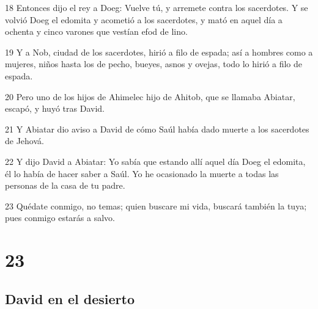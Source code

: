 \par 18 Entonces dijo el rey a Doeg: Vuelve tú, y arremete contra los sacerdotes. Y se volvió Doeg el edomita y acometió a los sacerdotes, y mató en aquel día a ochenta y cinco varones que vestían efod de lino.
\par 19 Y a Nob, ciudad de los sacerdotes, hirió a filo de espada; así a hombres como a mujeres, niños hasta los de pecho, bueyes, asnos y ovejas, todo lo hirió a filo de espada.
\par 20 Pero uno de los hijos de Ahimelec hijo de Ahitob, que se llamaba Abiatar, escapó, y huyó tras David.
\par 21 Y Abiatar dio aviso a David de cómo Saúl había dado muerte a los sacerdotes de Jehová.
\par 22 Y dijo David a Abiatar: Yo sabía que estando allí aquel día Doeg el edomita, él lo había de hacer saber a Saúl. Yo he ocasionado la muerte a todas las personas de la casa de tu padre.
\par 23 Quédate conmigo, no temas; quien buscare mi vida, buscará también la tuya; pues conmigo estarás a salvo.

\chapter{23}

\section*{David en el desierto}

